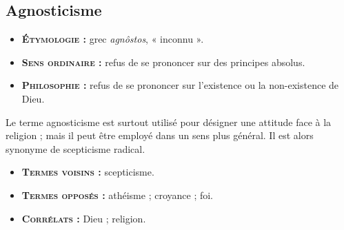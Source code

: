 \subsection{Agnosticisme}

{\footnotesize
\begin{itemize}[leftmargin=1cm, label=, itemsep=1pt]
\item {\bf \textsc{Étymologie} :} grec {\it agnôstos},
« inconnu ».
\item {\bf \textsc{Sens ordinaire} :} refus de se
prononcer sur des principes absolus.
\item {\bf \textsc{Philosophie} :} refus de se
prononcer sur l’existence ou la non-existence de Dieu.
\end{itemize}
}

Le terme agnosticisme est surtout utilisé
pour désigner une attitude face à la religion ;
mais il peut être employé dans un
sens plus général. Il est alors synonyme
de scepticisme radical.

{\footnotesize
\begin{itemize}[leftmargin=1cm, label=, itemsep=1pt]
\item {\bf \textsc{Termes voisins} :} scepticisme.
\item {\bf \textsc{Termes opposés} :} athéisme ;
croyance ; foi.
\item {\bf \textsc{Corrélats} :} Dieu ;
religion.
\end{itemize}
}

